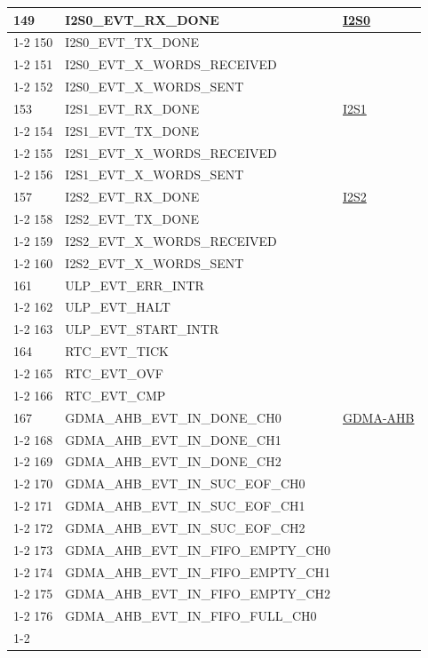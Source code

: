 \documentclass[main\_\_EN.tex]{subfiles}
\begin{document}
\begin{longtable}{ | l | l | l | }
149 & I2S0\_EVT\_RX\_DONE & \hyperref[mod:i2s]{I2S0}   \\ \cline{1-2}
150 & I2S0\_EVT\_TX\_DONE & \\ \cline{1-2}
151 & I2S0\_EVT\_X\_WORDS\_RECEIVED     & \\ \cline{1-2}
152 & I2S0\_EVT\_X\_WORDS\_SENT  & \\ \hline
153 & I2S1\_EVT\_RX\_DONE & \hyperref[mod:i2s]{I2S1}   \\ \cline{1-2}
154 & I2S1\_EVT\_TX\_DONE & \\ \cline{1-2}
155 & I2S1\_EVT\_X\_WORDS\_RECEIVED     & \\ \cline{1-2}
156 & I2S1\_EVT\_X\_WORDS\_SENT  & \\ \hline
157 & I2S2\_EVT\_RX\_DONE &  \hyperref[mod:i2s]{I2S2}   \\ \cline{1-2}
158 & I2S2\_EVT\_TX\_DONE & \\ \cline{1-2}
159 & I2S2\_EVT\_X\_WORDS\_RECEIVED     & \\ \cline{1-2}
160 & I2S2\_EVT\_X\_WORDS\_SENT  & \\ \hline
161 & ULP\_EVT\_ERR\_INTR  & \nameref{mod:ulp}   \\ \cline{1-2}
162 & ULP\_EVT\_HALT & \\ \cline{1-2}
163 & ULP\_EVT\_START\_INTR& \\ \hline
164 & RTC\_EVT\_TICK     & \nameref{mod:rtctimer}   \\ \cline{1-2}
165 & RTC\_EVT\_OVF      & \\ \cline{1-2}
166 & RTC\_EVT\_CMP      & \\ \hline
167 & GDMA\_AHB\_EVT\_IN\_DONE\_CH0  &  \hyperref[mod:dma]{GDMA-AHB} \\ \cline{1-2}
168 & GDMA\_AHB\_EVT\_IN\_DONE\_CH1  & \\ \cline{1-2}
169 & GDMA\_AHB\_EVT\_IN\_DONE\_CH2  & \\ \cline{1-2}
170 & GDMA\_AHB\_EVT\_IN\_SUC\_EOF\_CH0     & \\ \cline{1-2}
171 & GDMA\_AHB\_EVT\_IN\_SUC\_EOF\_CH1     & \\ \cline{1-2}
172 & GDMA\_AHB\_EVT\_IN\_SUC\_EOF\_CH2     & \\ \cline{1-2}
173 & GDMA\_AHB\_EVT\_IN\_FIFO\_EMPTY\_CH0  & \\ \cline{1-2}
174 & GDMA\_AHB\_EVT\_IN\_FIFO\_EMPTY\_CH1  & \\ \cline{1-2}
175 & GDMA\_AHB\_EVT\_IN\_FIFO\_EMPTY\_CH2  & \\ \cline{1-2}
176 & GDMA\_AHB\_EVT\_IN\_FIFO\_FULL\_CH0   & \\ \cline{1-2}

\end{longtable}
\end{document}
